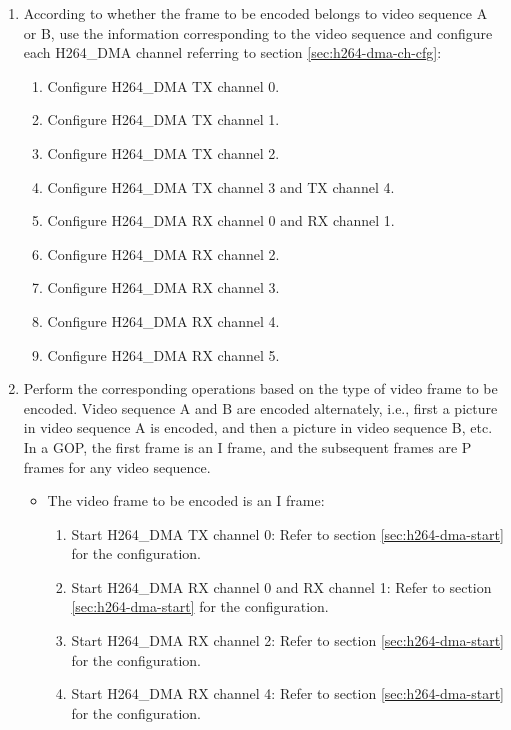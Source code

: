 \documentclass[main\_\_EN.tex]{subfiles}
\begin{document}
\begin{enumerate}
\begin{enumerate}
        \item To use the debug function, configure its related registers referring to the description in section \ref{sec:h264-debug-func}.
    \end{enumerate}
    \item\label{item:h264-dual-dma} According to whether the frame to be encoded belongs to video sequence A or B, use the information corresponding to the video sequence and configure each H264\_DMA channel referring to section \ref{sec:h264-dma-ch-cfg}:
    \begin{enumerate}
        \item Configure H264\_DMA TX channel 0.
        \item Configure H264\_DMA TX channel 1.
        \item Configure H264\_DMA TX channel 2.
        \item Configure H264\_DMA TX channel 3 and TX channel 4.
        \item Configure H264\_DMA RX channel 0 and RX channel 1.
        \item Configure H264\_DMA RX channel 2.
        \item Configure H264\_DMA RX channel 3.
        \item Configure H264\_DMA RX channel 4.
        \item Configure H264\_DMA RX channel 5.
    \end{enumerate}
    \item\label{item:h264-dual-frame} Perform the corresponding operations based on the type of video frame to be encoded. Video sequence A and B are encoded alternately, i.e., first a picture in video sequence A is encoded, and then a picture in video sequence B, etc. In a GOP, the first frame is an I frame, and the subsequent frames are P frames for any video sequence.
    \begin{itemize}
        \item The video frame to be encoded is an I frame:
        \begin{enumerate}
            \item Start H264\_DMA TX channel 0: Refer to section \ref{sec:h264-dma-start} for the configuration.
            \item Start H264\_DMA RX channel 0 and RX channel 1: Refer to section \ref{sec:h264-dma-start} for the configuration.
            \item Start H264\_DMA RX channel 2: Refer to section \ref{sec:h264-dma-start} for the configuration.
            \item Start H264\_DMA RX channel 4: Refer to section \ref{sec:h264-dma-start} for the configuration.

\end{enumerate}
\end{itemize}
\end{enumerate}
\end{document}
